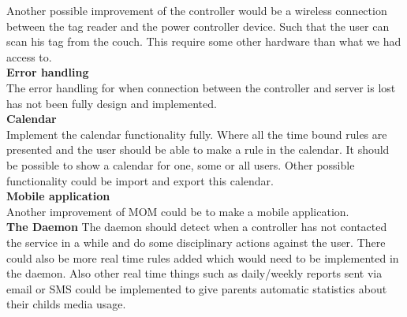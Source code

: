 Another possible improvement of the controller would be a wireless connection between the tag reader and the power controller device. Such that the user can scan his tag from the couch. This require some other hardware than what we had access to.\\

\textbf{Error handling}\\
The error handling for when connection between the controller and server is lost has not been fully design and implemented. \\

\textbf{Calendar}\\
Implement the calendar functionality fully. Where all the time bound rules are presented and the user should be able to make a rule in the calendar. It should be possible to show a calendar for one, some or all users. Other possible functionality could be import and export this calendar.\\

\textbf{Mobile application}\\
Another improvement of MOM could be to make a mobile application.\\

\textbf{The Daemon}
The daemon should detect when a controller has not contacted the service in a while and do some disciplinary actions against the user. There could also be more real time rules added which would need to be implemented in the daemon. Also other real time things such as daily/weekly reports sent via email or SMS could be implemented to give parents automatic statistics about their childs media usage. 